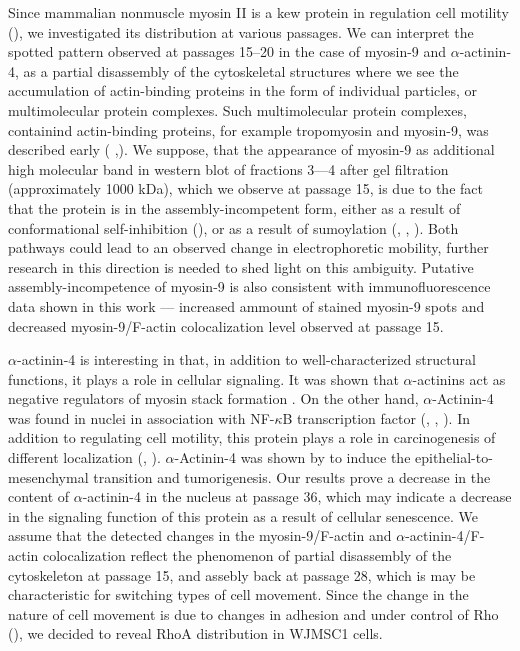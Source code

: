 \documentclass[alpha-refs]{wiley-article}
\begin{document}
Since mammalian nonmuscle myosin II is a kew protein in regulation cell motility (\cite{shutova2018mammalian}), we investigated its distribution at various passages.
We can interpret the spotted pattern observed at passages 15--20 in the case of myosin-9 and $\alpha$-actinin-4, as a partial disassembly of the cytoskeletal structures where we see the accumulation of actin-binding proteins in the form of individual particles, or multimolecular protein complexes.
Such multimolecular protein complexes, containind actin-binding proteins, for example tropomyosin and myosin-9, was described early (\cite{grenklo2008tropomyosin} ,\cite{bobkov2017effect}).
We suppose, that the appearance of myosin-9 as additional high molecular band in western blot of fractions 3---4 after gel filtration (approximately 1000 kDa), which we observe at passage 15, is due to the fact that the protein is in the assembly-incompetent form, either as a result of conformational self-inhibition (\cite{vicente2009non}), or as a result of sumoylation (\cite{hofmann2009sumoylation}, \cite{alonso2015emerging}, \cite{salah2016chaperone}).
Both pathways could lead to an observed change in electrophoretic mobility, further research in this direction is needed to shed light on this ambiguity.
Putative assembly-incompetence of myosin-9 is also consistent with immunofluorescence data shown in this work --- increased ammount of stained myosin-9 spots and decreased myosin-9/F-actin colocalization level observed at passage 15.

$\alpha$-actinin-4 is interesting in that, in addition to well-characterized structural functions, it plays a role in cellular signaling.
It was shown that $\alpha$-actinins act as negative regulators of myosin stack formation \cite{hu2019reciprocal}.
On the other hand, $\alpha$-Actinin-4 was found in nuclei in association with NF-$\kappa$B transcription factor (\cite{bolshakova2007extra}, \cite{babakov2008rela}, \cite{lomert2018co}).
In addition to regulating cell motility, this protein plays a role in carcinogenesis of different localization (\cite{barbolina2008motility}, \cite{hsu2013alpha}).
$\alpha$-Actinin-4 was shown by \cite{an2016alpha} to induce the epithelial-to-mesenchymal transition and tumorigenesis.
Our results prove a decrease in the content of $\alpha$-actinin-4 in the nucleus at passage 36, which may indicate a decrease in the signaling function of this protein as a result of cellular senescence.
We assume that the detected changes in the myosin-9/F-actin and $\alpha$-actinin-4/F-actin colocalization reflect the phenomenon of partial disassembly of the cytoskeleton at passage 15, and assebly back at passage 28, which is may be characteristic for switching types of cell movement.
Since the change in the nature of cell movement is due to changes in adhesion and under control of Rho (\cite{huveneers2009adhesion}), we decided to reveal RhoA distribution in WJMSC1 cells.
\end{document}
